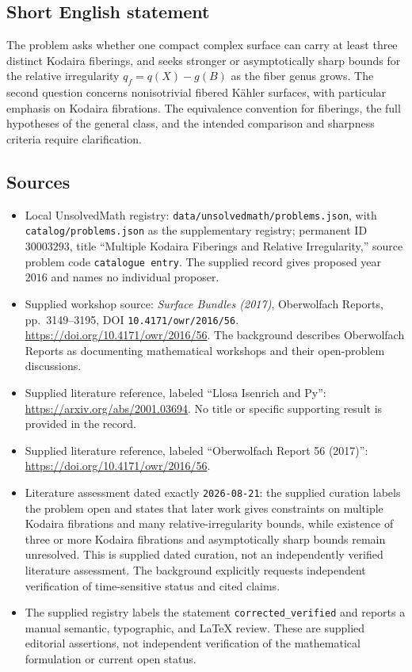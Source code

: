 \documentclass[11pt]{article}
\begin{document}
\subsection{Short English statement}
The problem asks whether one compact complex surface can carry at least three distinct Kodaira fiberings, and seeks stronger or asymptotically sharp bounds for the relative irregularity \(q_f=q(X)-g(B)\) as the fiber genus grows. The second question concerns nonisotrivial fibered K\"ahler surfaces, with particular emphasis on Kodaira fibrations. The equivalence convention for fiberings, the full hypotheses of the general class, and the intended comparison and sharpness criteria require clarification.
\subsection{Sources}
\begin{itemize}
\item Local UnsolvedMath registry: \texttt{data/unsolvedmath/problems.json}, with \texttt{catalog/problems.json} as the supplementary registry; permanent ID \(30003293\), title ``Multiple Kodaira Fiberings and Relative Irregularity,'' source problem code \texttt{catalogue entry}. The supplied record gives proposed year \(2016\) and names no individual proposer.
\item Supplied workshop source: \emph{Surface Bundles (2017)}, Oberwolfach Reports, pp.\ 3149--3195, DOI \texttt{10.4171/owr/2016/56}. \url{https://doi.org/10.4171/owr/2016/56}. The background describes Oberwolfach Reports as documenting mathematical workshops and their open-problem discussions.
\item Supplied literature reference, labeled ``Llosa Isenrich and Py'': \url{https://arxiv.org/abs/2001.03694}. No title or specific supporting result is provided in the record.
\item Supplied literature reference, labeled ``Oberwolfach Report 56 (2017)'': \url{https://doi.org/10.4171/owr/2016/56}.
\item Literature assessment dated exactly \texttt{2026-08-21}: the supplied curation labels the problem open and states that later work gives constraints on multiple Kodaira fibrations and many relative-irregularity bounds, while existence of three or more Kodaira fibrations and asymptotically sharp bounds remain unresolved. This is supplied dated curation, not an independently verified literature assessment. The background explicitly requests independent verification of time-sensitive status and cited claims.
\item The supplied registry labels the statement \texttt{corrected\_verified} and reports a manual semantic, typographic, and LaTeX review. These are supplied editorial assertions, not independent verification of the mathematical formulation or current open status.
\end{itemize}
\end{document}
